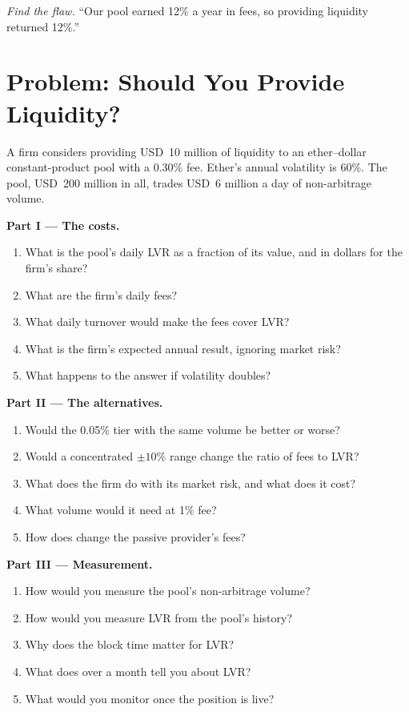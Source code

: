 \begin{exercise}[$\star\star\star$]\label{exo:m3:automated-market-makers:8}
\emph{Find the flaw.} ``Our pool earned 12\% a year in fees, so providing liquidity returned 12\%.''
\end{exercise}

\section{Problem: Should You Provide Liquidity?}

\begin{problem}\label{pb:m3:automated-market-makers:1}
A firm considers providing USD~10 million of liquidity to an ether--dollar constant-product pool with a 0.30\% fee. Ether's annual volatility is 60\%.
The pool, USD~200 million in all, trades USD~6 million a day of non-arbitrage volume.

\medskip\noindent\textbf{Part I --- The costs.}
\begin{enumerate}
\item What is the pool's daily LVR as a fraction of its value, and in dollars for the firm's share?
\item What are the firm's daily fees?
\item What daily turnover would make the fees cover LVR?
\item What is the firm's expected annual result, ignoring market risk?
\item What happens to the answer if volatility doubles?
\end{enumerate}

\medskip\noindent\textbf{Part II --- The alternatives.}
\begin{enumerate}[resume]
\item Would the 0.05\% tier with the same volume be better or worse?
\item Would a concentrated $\pm10\%$ range change the ratio of fees to LVR?
\item What does the firm do with its market risk, and what does it cost?
\item What volume would it need at 1\% fee?
\item How does  change the passive provider's fees?
\end{enumerate}

\medskip\noindent\textbf{Part III --- Measurement.}
\begin{enumerate}[resume]
\item How would you measure the pool's non-arbitrage volume?
\item How would you measure LVR from the pool's history?
\item Why does the block time matter for LVR?
\item What does  over a month tell you about LVR?
\item What would you monitor once the position is live?
\end{enumerate}


\end{problem}
